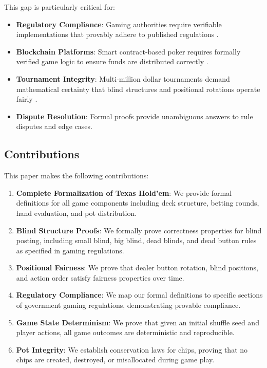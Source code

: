 \documentclass[11pt,a4paper]{article}
\begin{document}
This gap is particularly critical for:
\begin{itemize}
    \item \textbf{Regulatory Compliance}: Gaming authorities require verifiable implementations that provably adhere to published regulations \cite{montana2014poker, nevada2023gaming}.
    \item \textbf{Blockchain Platforms}: Smart contract-based poker requires formally verified game logic to ensure funds are distributed correctly \cite{kalodner2018arbitrum}.
    \item \textbf{Tournament Integrity}: Multi-million dollar tournaments demand mathematical certainty that blind structures and positional rotations operate fairly \cite{tda2024rules}.
    \item \textbf{Dispute Resolution}: Formal proofs provide unambiguous answers to rule disputes and edge cases.
\end{itemize}

\subsection{Contributions}

This paper makes the following contributions:

\begin{enumerate}
    \item \textbf{Complete Formalization of Texas Hold'em}: We provide formal definitions for all game components including deck structure, betting rounds, hand evaluation, and pot distribution.

    \item \textbf{Blind Structure Proofs}: We formally prove correctness properties for blind posting, including small blind, big blind, dead blinds, and dead button rules as specified in gaming regulations.

    \item \textbf{Positional Fairness}: We prove that dealer button rotation, blind positions, and action order satisfy fairness properties over time.

    \item \textbf{Regulatory Compliance}: We map our formal definitions to specific sections of government gaming regulations, demonstrating provable compliance.

    \item \textbf{Game State Determinism}: We prove that given an initial shuffle seed and player actions, all game outcomes are deterministic and reproducible.

    \item \textbf{Pot Integrity}: We establish conservation laws for chips, proving that no chips are created, destroyed, or misallocated during game play.
\end{enumerate}
\end{document}
